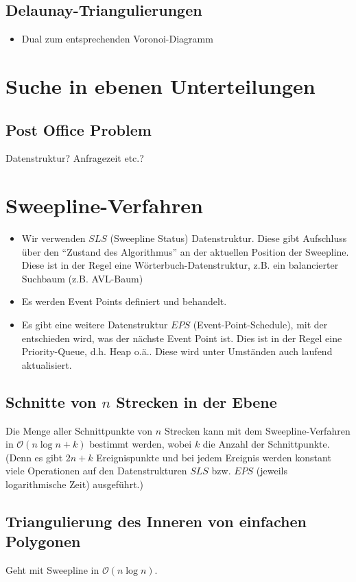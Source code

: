 \documentclass[a4paper]{article}
\begin{document}
\subsection*{Delaunay-Triangulierungen}
\begin{itemize}
	\item Dual zum entsprechenden Voronoi-Diagramm
\end{itemize}

\section*{Suche in ebenen Unterteilungen}
\subsection*{Post Office Problem}
Datenstruktur? Anfragezeit etc.?

\section*{Sweepline-Verfahren}
\begin{itemize}
	\item Wir verwenden $SLS$ (Sweepline Status) Datenstruktur. Diese gibt Aufschluss über den
	"`Zustand des Algorithmus"' an der aktuellen Position der Sweepline. Diese ist in der Regel
	eine Wörterbuch-Datenstruktur, z.B. ein balancierter Suchbaum (z.B. AVL-Baum) 
	\item Es werden Event Points definiert und behandelt.
	\item Es gibt eine weitere Datenstruktur $EPS$ (Event-Point-Schedule), mit 
	der entschieden wird, was der nächste Event Point ist. Dies ist in der Regel eine 
	Priority-Queue, d.h. Heap o.ä.. Diese wird unter Umständen auch laufend aktualisiert.
\end{itemize}
\subsection*{Schnitte von $n$ Strecken in der Ebene}
Die Menge aller Schnittpunkte von $n$ Strecken kann mit dem Sweepline-Verfahren in $\mathcal{O}(n \log n + k)$ bestimmt werden, wobei $k$ die Anzahl der Schnittpunkte. (Denn es gibt $2n + k$ Ereignispunkte
und bei jedem Ereignis werden konstant viele Operationen auf den Datenstrukturen $SLS$ bzw. $EPS$ 
(jeweils logarithmische Zeit) ausgeführt.)
\subsection*{Triangulierung des Inneren von einfachen Polygonen}
Geht mit Sweepline in $\mathcal{O}(n \log n)$.
\end{document}
